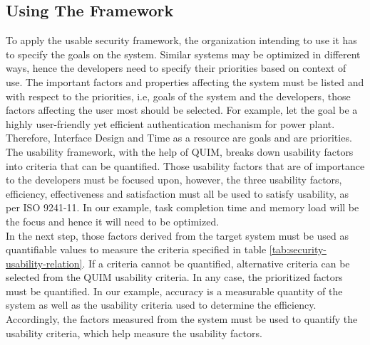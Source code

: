 \subsection{Using The Framework}
To apply the usable security framework, the organization intending to use it has to specify the goals on the system. Similar systems may be optimized in different ways, hence the developers need to specify their priorities based on context of use. The important factors and properties affecting the system must be listed and with respect to the priorities, i.e, goals of the system and the developers, those factors affecting the user most should be selected. For example, let the goal be a highly user-friendly yet efficient authentication mechanism for power plant. Therefore, Interface Design and Time as a resource are goals and are priorities.\\
The usability framework, with the help of QUIM, breaks down usability factors into criteria that can be quantified. Those usability factors that are of importance to the developers must be focused upon, however, the three usability factors, efficiency, effectiveness and satisfaction must all be used to satisfy usability, as per ISO 9241-11. In our example, task completion time and memory load will be the focus and hence it will need to be optimized.\\
In the next step, those factors derived from the target system must be used as quantifiable values to measure the criteria specified in table \ref{tab:security-usability-relation}. If a criteria cannot be quantified, alternative criteria can be selected from the QUIM usability criteria. In any case, the prioritized factors must be quantified. In our example, accuracy is a measurable quantity of the system as well as the usability criteria used to determine the efficiency.\\
Accordingly, the factors measured from the system must be used to quantify the usability criteria, which help measure the usability factors. 

